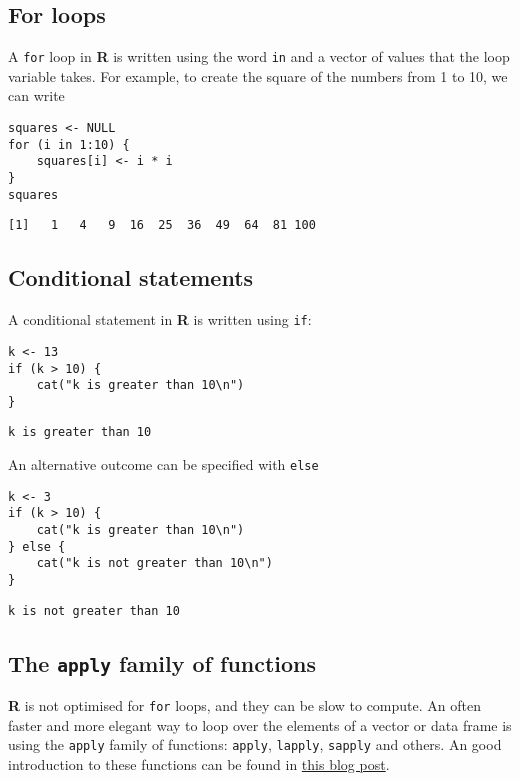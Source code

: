\documentclass[11pt,a4paper]{article}
\begin{document}
\subsection{For loops}
\label{sec-4-1}
A \texttt{for} loop in \textbf{R} is written using the word \texttt{in} and a vector of values that the loop variable takes. For example, to create the square of the numbers from 1 to 10, we can write \\

\begin{verbatim}
squares <- NULL
for (i in 1:10) {
    squares[i] <- i * i
}
squares
\end{verbatim}

\begin{verbatim}
[1]   1   4   9  16  25  36  49  64  81 100
\end{verbatim}

\subsection{Conditional statements}
\label{sec-4-2}

A conditional statement in \textbf{R} is written using \texttt{if}: \\

\begin{verbatim}
k <- 13
if (k > 10) {
    cat("k is greater than 10\n")
}
\end{verbatim}

\begin{verbatim}
k is greater than 10
\end{verbatim}

An alternative outcome can be specified with \texttt{else} \\

\begin{verbatim}
k <- 3
if (k > 10) {
    cat("k is greater than 10\n")
} else {
    cat("k is not greater than 10\n")
}
\end{verbatim}

\begin{verbatim}
k is not greater than 10
\end{verbatim}

\subsection{The \texttt{apply} family of functions}
\label{sec-4-3}

\textbf{R} is not optimised for \texttt{for} loops, and they can be slow to compute. An often faster and more elegant way to loop over the elements of a vector or data frame is using the \texttt{apply} family of functions: \texttt{apply}, \texttt{lapply}, \texttt{sapply} and others. An good introduction to these functions can be found in \href{http://nsaunders.wordpress.com/2010/08/20/a-brief-introduction-to-apply-in-r/}{this blog post}. \\
\end{document}
